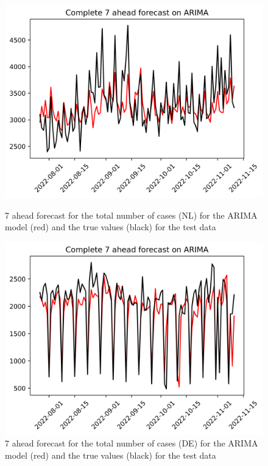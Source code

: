 \begin{figure}

\begin{minipage}{.45\textwidth}
  \centering
  \includegraphics[width=\linewidth]{pics/7_ah/Complete_7_ahead_ARIMA.png}
  \caption{7 ahead forecast for the total number of cases (NL) for the ARIMA model (red) and the true values (black) for the test data}
  \label{fig:tot_cases_fc_7_ARIMA}
\end{minipage}
\begin{minipage}{.45\textwidth}
  \centering
  \includegraphics[width=\linewidth]{pics/7_ah/DE_Complete_7_ahead_ARIMA.png}
  \caption{7 ahead forecast for the total number of cases (DE) for the ARIMA model (red) and the true values (black) for the test data}
  \label{fig:tot_cases_fc_7_ARIMA_DE}
\end{minipage}

\end{figure}
